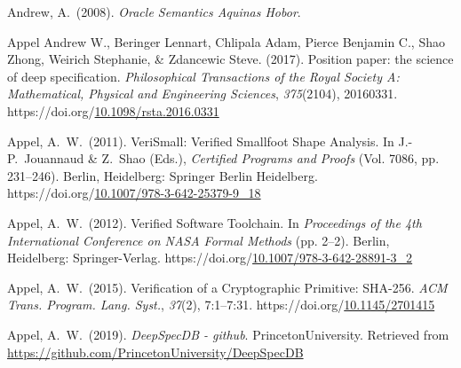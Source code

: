 \documentclass[12pt,twoside]{article}
\begin{document}
{\begin{thebibliography}{222}
\mdbibitemlabel{[Andrew, 2008]}Andrew, A.~(2008). \emph{Oracle Semantics Aquinas Hobor}.\label{andrew_oracle_2008}%

Appel Andrew W., Beringer Lennart, Chlipala Adam, Pierce Benjamin C., Shao Zhong, Weirich Stephanie, \& Zdancewic Steve. (2017). Position paper: the science of deep specification. \emph{Philosophical Transactions of the Royal Society A: Mathematical, Physical and Engineering Sciences}, \emph{375}(2104), 20160331. https://doi.org/\href{https://dx.doi.org/10.1098/rsta.2016.0331}{10.1098/rsta.2016.0331}\label{appel_andrew_w._position_2017}%

\mdbibitemlabel{[Appel, 2011]}Appel, A.~W.~(2011). VeriSmall: Verified Smallfoot Shape Analysis. In J.-P.~Jouannaud \& Z.~Shao (Eds.), \emph{Certified Programs and Proofs} (Vol. 7086, pp. 231–246). Berlin, Heidelberg: Springer Berlin Heidelberg. https://doi.org/\href{https://dx.doi.org/10.1007/978-3-642-25379-9_18}{10.1007/978-3-642-25379-9\_18}\label{jouannaud_verismall:_2011}%

\mdbibitemlabel{[Appel, 2012]}Appel, A.~W.~(2012). Verified Software Toolchain. In \emph{Proceedings of the 4th International Conference on NASA Formal Methods} (pp. 2–2). Berlin, Heidelberg: Springer-Verlag. https://doi.org/\href{https://dx.doi.org/10.1007/978-3-642-28891-3_2}{10.1007/978-3-642-28891-3\_2}\label{appel_verified_2012}%

\mdbibitemlabel{[Appel, 2015]}Appel, A.~W.~(2015). Verification of a Cryptographic Primitive: SHA-256. \emph{ACM Trans. Program. Lang. Syst.}, \emph{37}(2), 7:1–7:31. https://doi.org/\href{https://dx.doi.org/10.1145/2701415}{10.1145/2701415}\label{appel_verification_2015}%

\mdbibitemlabel{[Appel, 2019]}Appel, A.~W.~(2019). \emph{DeepSpecDB - github}. PrincetonUniversity. Retrieved from \href{https://github.com/PrincetonUniversity/DeepSpecDB}{{\ttfamily https://\hspace{0pt}github.\hspace{0pt}com/\hspace{0pt}PrincetonUniversity/\hspace{0pt}DeepSpecDB}}\label{appel_deepspecdb_2019}%


\end{thebibliography}}
\end{document}

